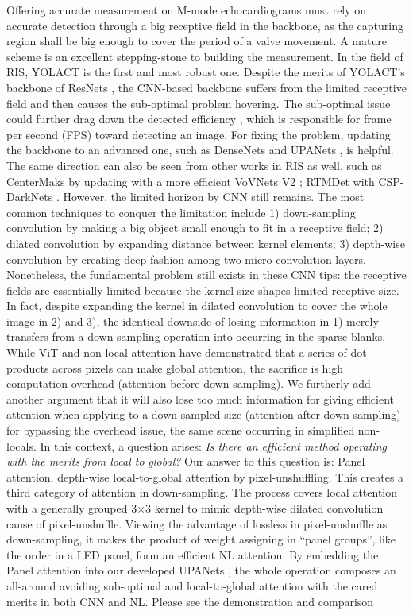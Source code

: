 \documentclass{article}
\begin{document}
Offering accurate measurement on M-mode echocardiograms must rely on accurate detection through a big receptive field in the backbone, as the capturing region shall be big enough to cover the period of a valve movement. A mature scheme is an excellent stepping-stone to building the measurement. In the field of RIS, YOLACT \cite{bolya2019yolact}\cite{bolya1912yolact++} is the first and most robust one. Despite the merits of YOLACT's backbone of ResNets \cite{he2016deep}, the CNN-based backbone suffers from the limited receptive field \cite{wang2018non} and then causes the sub-optimal problem hovering. The sub-optimal issue could further drag down the detected efficiency \cite{lee2020centermask}, which is responsible for frame per second (FPS) toward detecting an image. For fixing the problem, updating the backbone to an advanced one, such as DenseNets \cite{huang2017densely} and UPANets \cite{tseng2022upanets}, is helpful. The same direction can also be seen from other works in RIS as well, such as CenterMaks by updating with a more efficient VoVNets V2 \cite{lee2020centermask}; RTMDet with CSP-DarkNets \cite{lyu2022rtmdet}. However, the limited horizon by CNN still remains. The most common techniques to conquer the limitation include 1) down-sampling convolution by making a big object small enough to fit in a receptive field; 2) dilated convolution by expanding distance between kernel elements; 3) depth-wise convolution \cite{chollet2017xception} by creating deep fashion among two micro convolution layers. Nonetheless, the fundamental problem still exists in these CNN tips: the receptive fields are essentially limited because the kernel size shapes limited receptive size. In fact, despite expanding the kernel in dilated convolution to cover the whole image in 2) and 3), the identical downside of losing information in 1) merely transfers from a down-sampling operation into occurring in the sparse blanks. While ViT \cite{dosovitskiy2020image} and non-local \cite{wang2018non} attention have demonstrated that a series of dot-products across pixels can make global attention, the sacrifice is high computation overhead (attention before down-sampling). We furtherly add another argument that it will also lose too much information for giving efficient attention when applying to a down-sampled size (attention after down-sampling) for bypassing the overhead issue, the same scene occurring in simplified non-locals. In this context, a question arises: \textit{Is there an efficient method operating with the merits from local to global?} Our answer to this question is: Panel attention, depth-wise local-to-global attention by pixel-unshuffling. This creates a third category of attention in down-sampling. The process covers local attention with a generally grouped 3×3 kernel to mimic depth-wise dilated convolution cause of pixel-unshuffle. Viewing the advantage of lossless in pixel-unshuffle as down-sampling, it makes the product of weight assigning in “panel groups”, like the order in a LED panel, form an efficient NL attention. By embedding the Panel attention into our developed UPANets \cite{tseng2022upanets}, the whole operation composes an all-around avoiding sub-optimal and local-to-global attention with the cared merits in both CNN and NL. Please see the demonstration and comparison 
\end{document}
